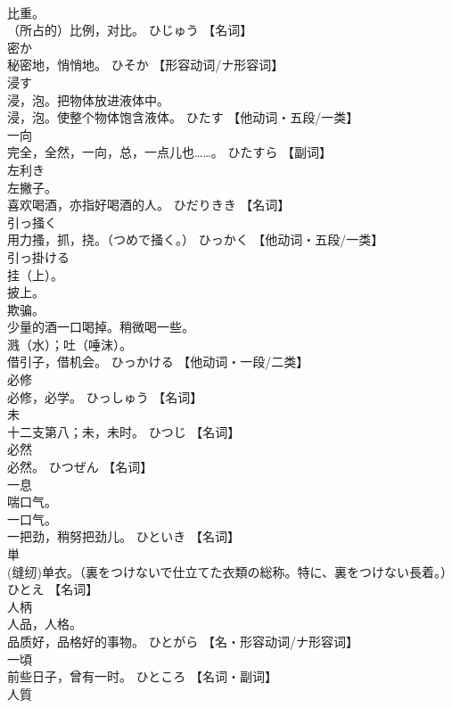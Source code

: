 \documentclass[8pt]{extreport}
\begin{document}
\begin{CJK}{UTF8}{min}
\\	比重。 
\\	（所占的）比例，对比。	ひじゅう		【名词】
\\	密か	
\\	秘密地，悄悄地。	ひそか		【形容动词/ナ形容词】
\\	浸す	
\\	浸，泡。把物体放进液体中。 
\\	浸，泡。使整个物体饱含液体。	ひたす		【他动词・五段/一类】
\\	一向	
\\	完全，全然，一向，总，一点儿也……。	ひたすら		【副词】
\\	左利き	
\\	左撇子。 
\\	喜欢喝酒，亦指好喝酒的人。	ひだりきき		【名词】
\\	引っ掻く	
\\	用力搔，抓，挠。（つめで掻く。）	ひっかく		【他动词・五段/一类】
\\	引っ掛ける	
\\	挂（上）。 
\\	披上。 
\\	欺骗。 
\\	少量的酒一口喝掉。稍微喝一些。 
\\	溅（水）；吐（唾沫）。 
\\	借引子，借机会。	ひっかける		【他动词・一段/二类】
\\	必修	
\\	必修，必学。	ひっしゅう		【名词】
\\	未	
\\	十二支第八；未，未时。	ひつじ		【名词】
\\	必然	
\\	必然。	ひつぜん		【名词】
\\	一息	
\\	喘口气。 
\\	一口气。 
\\	一把劲，稍努把劲儿。	ひといき		【名词】
\\	単	
\\	(缝纫)单衣。（裏をつけないで仕立てた衣類の総称。特に、裏をつけない長着。）	ひとえ		【名词】
\\	人柄	
\\	人品，人格。 
\\	品质好，品格好的事物。	ひとがら		【名・形容动词/ナ形容词】
\\	一頃	
\\	前些日子，曾有一时。	ひところ		【名词・副词】
\\	人質	

\end{CJK}
\end{document}
